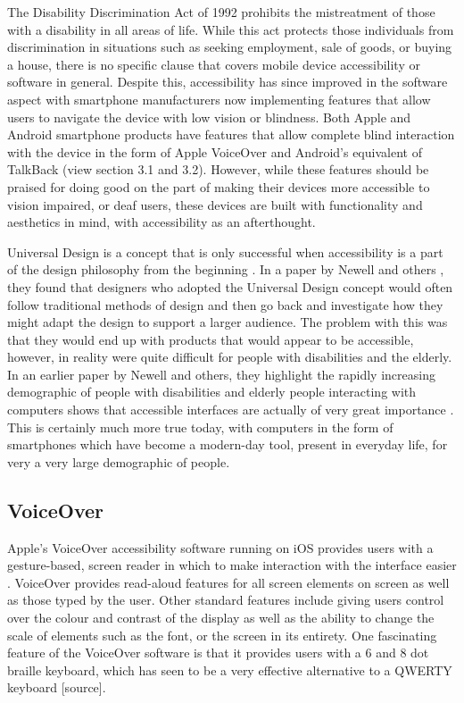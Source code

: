 The Disability Discrimination Act of 1992 \cite{dda1992} prohibits the mistreatment of those with a disability in all areas of life.
While this act protects those individuals from discrimination in situations such as seeking employment, sale of goods, or buying a house, there is no specific clause that covers mobile device accessibility or software in general.
Despite this, accessibility has since improved in the software aspect with smartphone manufacturers now implementing features that allow users to navigate the device with low vision or blindness.
Both Apple and Android smartphone products have features that allow complete blind interaction with the device in the form of Apple VoiceOver \cite{iphone} and Android's equivalent of TalkBack \cite{android} (view section 3.1 and 3.2).
However, while these features should be praised for doing good on the part of making their devices more accessible to vision impaired, or deaf users, these devices are built with functionality and aesthetics in mind, with accessibility as an afterthought.

Universal Design is a concept that is only successful when accessibility is a part of the design philosophy from the beginning \cite{incldesign}.
In a paper by Newell and others \cite{incldesign}, they found that designers who adopted the Universal Design concept would often follow traditional methods of design and then go back and investigate how they might adapt the design to support a larger audience.
The problem with this was that they would end up with products that would appear to be accessible, however, in reality were quite difficult for people with disabilities and the elderly.
In an earlier paper by Newell and others, they highlight the rapidly increasing demographic of people with disabilities and elderly people interacting with computers shows that accessible interfaces are actually of very great importance \cite{computerinterface}.
This is certainly much more true today, with computers in the form of smartphones which have become a modern-day tool, present in everyday life, for very a very large demographic of people.


\subsection{VoiceOver}
Apple's VoiceOver accessibility software running on iOS provides users with a gesture-based, screen reader in which to make interaction with the interface easier \cite{iphone}.
VoiceOver provides read-aloud features for all screen elements on screen as well as those typed by the user.
Other standard features include giving users control over the colour and contrast of the display as well as the ability to change the scale of elements such as the font, or the screen in its entirety.
One fascinating feature of the VoiceOver software is that it provides users with a 6 and 8 dot braille keyboard, which has seen to be a very effective alternative to a QWERTY keyboard [source]. %

